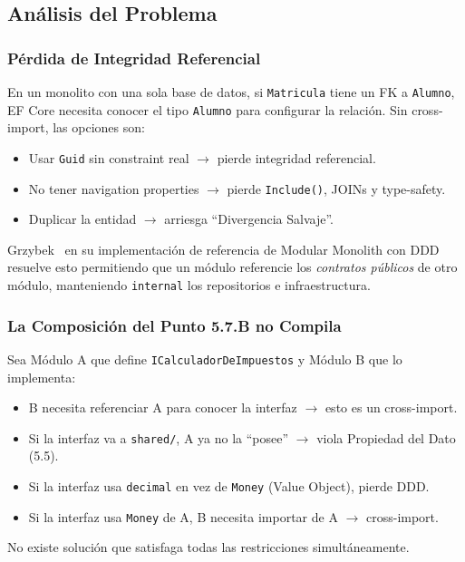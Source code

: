 \documentclass[conference]{IEEEtran}
\begin{document}
\subsection{An\'alisis del Problema}

\subsubsection{P\'erdida de Integridad Referencial}
En un monolito con una sola base de datos, si \texttt{Matricula} tiene un FK a \texttt{Alumno}, EF Core necesita conocer el tipo \texttt{Alumno} para configurar la relaci\'on. Sin cross-import, las opciones son:

\begin{itemize}[leftmargin=1.5em, itemsep=1pt]
    \item Usar \texttt{Guid} sin constraint real $\to$ pierde integridad referencial.
    \item No tener navigation properties $\to$ pierde \texttt{Include()}, JOINs y type-safety.
    \item Duplicar la entidad $\to$ arriesga ``Divergencia Salvaje''.
\end{itemize}

Grzybek~\cite{grzybek2019} en su implementaci\'on de referencia de Modular Monolith con DDD resuelve esto permitiendo que un m\'odulo referencie los \textit{contratos p\'ublicos} de otro m\'odulo, manteniendo \texttt{internal} los repositorios e infraestructura.

\subsubsection{La Composici\'on del Punto 5.7.B no Compila}

\begin{contradictionbox}
Sea M\'odulo A que define \texttt{ICalculadorDeImpuestos} y M\'odulo B que lo implementa:
\begin{itemize}[leftmargin=1.5em, itemsep=1pt]
    \item B necesita referenciar A para conocer la interfaz $\to$ esto es un cross-import.
    \item Si la interfaz va a \texttt{shared/}, A ya no la ``posee'' $\to$ viola Propiedad del Dato (5.5).
    \item Si la interfaz usa \texttt{decimal} en vez de \texttt{Money} (Value Object), pierde DDD.
    \item Si la interfaz usa \texttt{Money} de A, B necesita importar de A $\to$ cross-import.
\end{itemize}
No existe soluci\'on que satisfaga todas las restricciones simult\'aneamente.
\end{contradictionbox}
\end{document}
